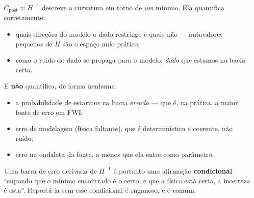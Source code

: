 \documentclass[11pt,a4paper,oneside]{report}
\begin{document}
\begin{teoria}
$C_{\text{post}} \approx H^{-1}$ descreve a curvatura em torno de \emph{um}
m\'inimo. Ela quantifica corretamente:
\begin{itemize}[leftmargin=*, itemsep=1pt]
\item quais dire\c{c}\~oes do modelo o dado restringe e quais n\~ao ---
autovalores pequenos de $H$ s\~ao o espa\c{c}o nulo pr\'atico;
\item como o ru\'ido do dado se propaga para o modelo, \emph{dado} que
estamos na bacia certa.
\end{itemize}

E \textbf{n\~ao} quantifica, de forma nenhuma:
\begin{itemize}[leftmargin=*, itemsep=1pt]
\item a probabilidade de estarmos na bacia \emph{errada} --- que \'e, na
pr\'atica, a maior fonte de erro em FWI;
\item erro de modelagem (f\'isica faltante), que \'e determin\'istico e
coerente, n\~ao ru\'ido;
\item erro na ondaleta da fonte, a menos que ela entre como par\^ametro.
\end{itemize}

Uma barra de erro derivada de $H^{-1}$ \'e portanto uma afirma\c{c}\~ao
\textbf{condicional}: ``supondo que o m\'inimo encontrado \'e o certo, e que a
f\'isica est\'a certa, a incerteza \'e esta''. Report\'a-la sem esse
condicional \'e enganoso, e \'e comum.
\end{teoria}
\end{document}
